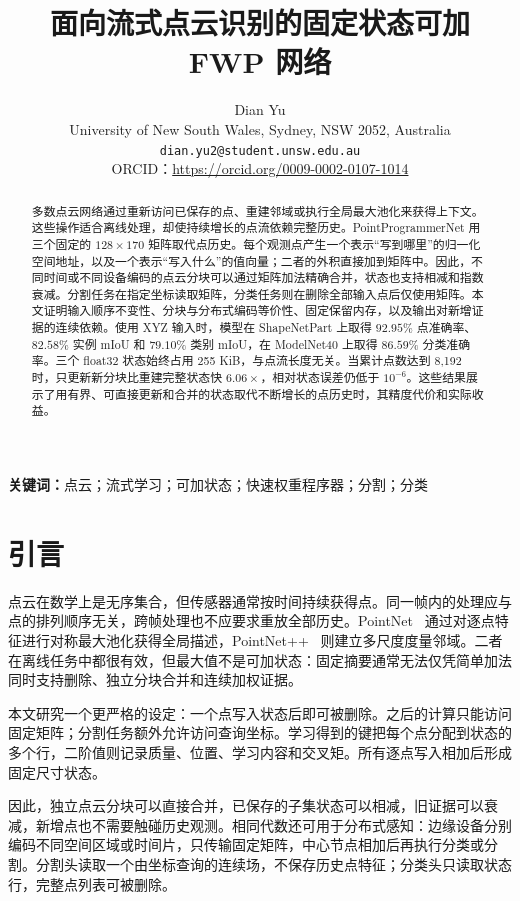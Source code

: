 \documentclass[UTF8,a4paper,11pt,fontset=windows]{ctexart}
\title{面向流式点云识别的固定状态可加 FWP 网络}
\author{Dian Yu\\
University of New South Wales, Sydney, NSW 2052, Australia\\
\texttt{dian.yu2@student.unsw.edu.au}\\
ORCID：\url{https://orcid.org/0009-0002-0107-1014}}
\date{}
\begin{document}
\maketitle

\begin{abstract}
多数点云网络通过重新访问已保存的点、重建邻域或执行全局最大池化来获得上下文。这些操作适合离线处理，却使持续增长的点流依赖完整历史。PointProgrammerNet 用三个固定的 $128\times170$ 矩阵取代点历史。每个观测点产生一个表示“写到哪里”的归一化空间地址，以及一个表示“写入什么”的值向量；二者的外积直接加到矩阵中。因此，不同时间或不同设备编码的点云分块可以通过矩阵加法精确合并，状态也支持相减和指数衰减。分割任务在指定坐标读取矩阵，分类任务则在删除全部输入点后仅使用矩阵。本文证明输入顺序不变性、分块与分布式编码等价性、固定保留内存，以及输出对新增证据的连续依赖。使用 XYZ 输入时，模型在 ShapeNetPart 上取得 $92.95\%$ 点准确率、$82.58\%$ 实例 mIoU 和 $79.10\%$ 类别 mIoU，在 ModelNet40 上取得 $86.59\%$ 分类准确率。三个 float32 状态始终占用 255 KiB，与点流长度无关。当累计点数达到 8,192 时，只更新新分块比重建完整状态快 $6.06\times$，相对状态误差仍低于 $10^{-6}$。这些结果展示了用有界、可直接更新和合并的状态取代不断增长的点历史时，其精度代价和实际收益。
\end{abstract}

\noindent\textbf{关键词：}点云；流式学习；可加状态；快速权重程序器；分割；分类

\section{引言}

点云在数学上是无序集合，但传感器通常按时间持续获得点。同一帧内的处理应与点的排列顺序无关，跨帧处理也不应要求重放全部历史。PointNet~\cite{qi2017pointnet} 通过对逐点特征进行对称最大池化获得全局描述，PointNet++~\cite{qi2017pointnetplusplus} 则建立多尺度度量邻域。二者在离线任务中都很有效，但最大值不是可加状态：固定摘要通常无法仅凭简单加法同时支持删除、独立分块合并和连续加权证据。

本文研究一个更严格的设定：一个点写入状态后即可被删除。之后的计算只能访问固定矩阵；分割任务额外允许访问查询坐标。学习得到的键把每个点分配到状态的多个行，二阶值则记录质量、位置、学习内容和交叉矩。所有逐点写入相加后形成固定尺寸状态。

因此，独立点云分块可以直接合并，已保存的子集状态可以相减，旧证据可以衰减，新增点也不需要触碰历史观测。相同代数还可用于分布式感知：边缘设备分别编码不同空间区域或时间片，只传输固定矩阵，中心节点相加后再执行分类或分割。分割头读取一个由坐标查询的连续场，不保存历史点特征；分类头只读取状态行，完整点列表可被删除。
\end{document}

